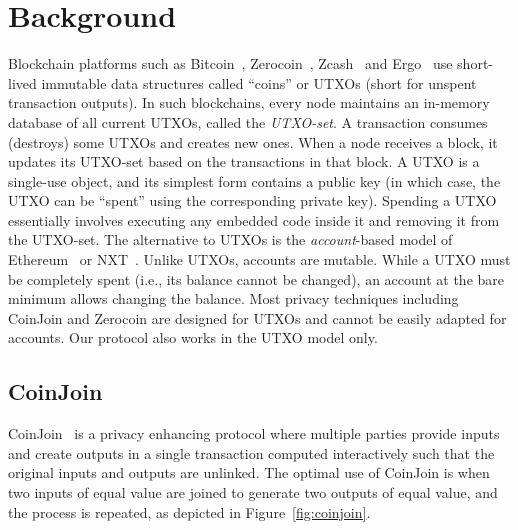 \documentclass[runningheads]{llncs}
\newcommand{\zerocoin}{Zerocoin\xspace}
\begin{document}
\section{Background}

Blockchain platforms such as Bitcoin~\cite{Nak08}, \zerocoin~\cite{zerocoin}, Zcash~\cite{zcash} and Ergo~\cite{ergo} use short-lived immutable data structures called ``coins'' or UTXOs (short for {unspent transaction outputs}). In such blockchains, every node maintains an in-memory database of all current UTXOs, called the {\em UTXO-set}. A transaction consumes (destroys) some UTXOs and creates new ones. When a node receives a block, it updates its UTXO-set based on the transactions in that block. A UTXO is a single-use object, and its simplest form contains a public key (in which case, the UTXO can be ``spent'' using the corresponding private key). Spending a UTXO essentially involves executing any embedded code inside it and removing it from the UTXO-set. 
The alternative to UTXOs is the {\em account}-based model of Ethereum~\cite{wood2014ethereum} or NXT~\cite{nxt}. Unlike UTXOs, accounts are mutable. While a UTXO must be completely spent (i.e., its balance cannot be changed), an account at the bare minimum allows changing the balance. Most privacy techniques including CoinJoin and \zerocoin are designed for UTXOs and cannot be easily adapted for accounts. Our protocol also works in the UTXO model only. 

\subsection{CoinJoin} 
\label{coinjoin}
CoinJoin~\cite{coinjoin} is a privacy enhancing protocol where multiple parties provide inputs and create outputs in a single transaction computed interactively such that the original inputs and outputs are unlinked. The optimal use of CoinJoin is when two inputs of equal value are joined to generate two outputs of equal value, and the process is repeated, as depicted in Figure~\ref{fig:coinjoin}. 
\end{document}
